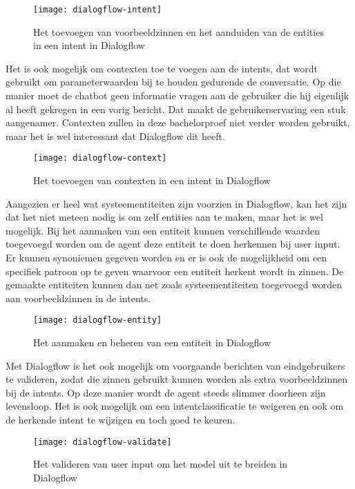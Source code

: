 \begin{figure}[H]
    \label{fig:dialogflow-intent}
    \centering
    \texttt{[image: dialogflow-intent]}
    \caption{Het toevoegen van voorbeeldzinnen en het aanduiden van de entities in een intent in Dialogflow}
\end{figure}

Het is ook mogelijk om contexten toe te voegen aan de intents, dat wordt gebruikt om parameterwaarden bij te houden gedurende de conversatie. Op die manier moet de chatbot geen informatie vragen aan de gebruiker die hij eigenlijk al heeft gekregen in een vorig bericht. Dat maakt de gebruikerservaring een stuk aangenamer. Contexten zullen in deze bachelorproef niet verder worden gebruikt, maar het is wel interessant dat Dialogflow dit heeft.

\begin{figure}[H]
    \label{fig:dialogflow-context}
    \centering
    \texttt{[image: dialogflow-context]}
    \caption{Het toevoegen van contexten in een intent in Dialogflow}
\end{figure}

Aangezien er heel wat systeementiteiten zijn voorzien in Dialogflow, kan het zijn dat het niet meteen nodig is om zelf entities aan te maken, maar het is wel mogelijk. Bij het aanmaken van een entiteit kunnen verschillende waarden toegevoegd worden om de agent deze entiteit te doen herkennen bij user input. Er kunnen synoniemen gegeven worden en er is ook de mogelijkheid om een specifiek patroon op te geven waarvoor een entiteit herkent wordt in zinnen. De gemaakte entiteiten kunnen dan net zoals systeementiteiten toegevoegd worden aan voorbeeldzinnen in de intents.

\begin{figure}[H]
    \label{fig:dialogflow-entity}
    \centering
    \texttt{[image: dialogflow-entity]}
    \caption{Het aanmaken en beheren van een entiteit in Dialogflow}
\end{figure}

Met Dialogflow is het ook mogelijk om voorgaande berichten van eindgebruikers te valideren, zodat die zinnen gebruikt kunnen worden als extra voorbeeldzinnen bij de intents. Op deze manier wordt de agent steeds slimmer doorheen zijn levensloop. Het is ook mogelijk om een intentclassificatie te weigeren en ook om de herkende intent te wijzigen en toch goed te keuren. 

\begin{figure}[H]
    \label{fig:dialogflow-validate}
    \centering
    \texttt{[image: dialogflow-validate]}
    \caption{Het valideren van user input om het model uit te breiden in Dialogflow}
\end{figure}

